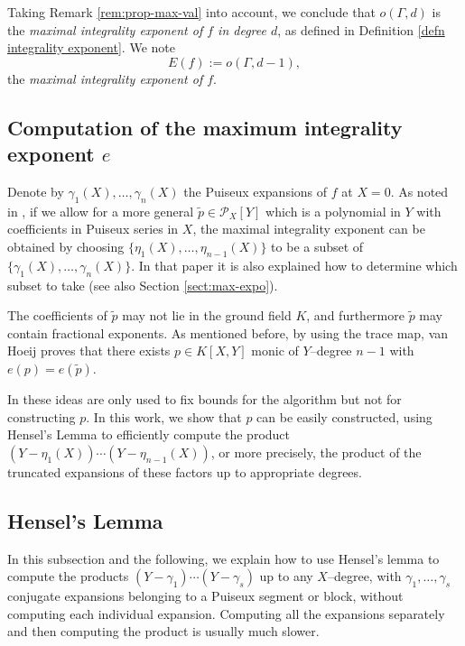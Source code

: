 \documentclass[a4paper,11pt]{amsart}%
\theoremstyle{definition}
\theoremstyle{plain}
\theoremstyle{remark}
\begin{document}
Taking Remark \ref{rem:prop-max-val} into account, we conclude that $o(\Gamma,d)$ is the {\emph{maximal integrality exponent
of $f$ in degree $d$}}, as defined in Definition \ref{defn integrality exponent}. We note 
$$
E(f):=o(\Gamma,d-1),
$$
the {\emph{maximal integrality exponent of $f$}}.



\subsection{Computation of the maximum integrality exponent $e$}
\label{subsection:maxexp}
Denote by $\gamma_{1}(X),\dots,\gamma_{n}(X)$ the Puiseux expansions of $f$ at
$X=0$. As noted in \cite[Theorem 5.1]{vanHoeij94}, if we allow for a more
general $\tilde{p}\in{\mathcal{P}_{X}}[Y]$ which is a polynomial in $Y$ with
coefficients in Puiseux series in $X$, the maximal integrality exponent can be
obtained by choosing $\{\eta_{1}(X),\dots,\eta_{n-1}(X)\}$ to be a subset of
$\{\gamma_{1}(X),\dots,\gamma_{n}(X)\}$. In that paper it is also explained
how to determine which subset to take (see also Section \ref{sect:max-expo}).

The coefficients of $\tilde{p}$ may not lie in the ground field $K$, and
furthermore $\tilde{p}$ may contain fractional exponents. As mentioned before,
by using the trace map, van Hoeij proves that there exists $p\in K[X,Y]$ monic
of $Y$--degree $n-1$ with $e(p)=e(\tilde{p})$.

In \cite{vanHoeij94} these ideas are only used to fix bounds for the algorithm
but not for constructing $p$. In this work, we show that $p$ can be easily
constructed, using Hensel's Lemma to efficiently compute the product
$(Y-\eta_{1}(X))\cdots(Y-\eta_{n-1}(X))$, or more precisely, the product of
the truncated expansions of these factors up to appropriate degrees.

\subsection{Hensel's Lemma\label{sec Hensel}}

In this subsection and the following, we explain how to use Hensel's lemma to
compute the products $(Y - \gamma_{1})\cdots(Y-\gamma_{s})$ up to any
$X$--degree, with $\gamma_{1}, \dots, \gamma_{s}$ conjugate expansions
belonging to a Puiseux segment or block, without computing each individual
expansion. Computing all the expansions separately and then computing the
product is usually much slower.
\end{document}

